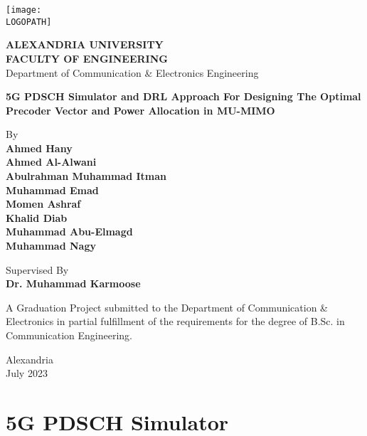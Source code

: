 \documentclass[12pt, a4paper, oneside]{book}
\def \LOGOPATH {au-logo1}
\def \UNIVERSITY {ALEXANDRIA UNIVERSITY}
\def \FACULTY {FACULTY OF ENGINEERING}
\def \DEPARTMENT {Department of Communication \& Electronics Engineering}
\def \PROJECTTITLE {5G PDSCH Simulator and DRL Approach For Designing The Optimal Precoder Vector and Power Allocation in MU-MIMO}
\def \SUPERVISOR {Dr. Muhammad Karmoose}
\begin{document}
\setlength{\parindent}{0em}
\setlength{\parskip}{1.5em}


\begin{titlepage}
    \centering
    \vfill
    \begin{center}
        \texttt{[image: \\LOGOPATH]}

        \vfill

        \textbf{\UNIVERSITY} \\
        \textbf{\FACULTY} \\
        \DEPARTMENT

        \vfill

        \LARGE{\textbf{\PROJECTTITLE}}
    
        \vfill
        By \\
        \textbf{Ahmed Hany} \\
        \textbf{Ahmed Al-Alwani} \\
        \textbf{Abulrahman Muhammad Itman} \\
        \textbf{Muhammad Emad} \\
        \textbf{Momen Ashraf} \\
        \textbf{Khalid Diab} \\
        \textbf{Muhammad Abu-Elmagd} \\
        \textbf{Muhammad Nagy}

        \vfill
        Supervised By \\
        \textbf{\SUPERVISOR}

        \vfill
        \large{A Graduation Project submitted to the Department of Communication \& Electronics in partial fulfillment of the requirements for the degree of B.Sc. in Communication Engineering.}

        \vspace{0.5cm}
        Alexandria\\
        July 2023
    
    \end{center}
\end{titlepage}

\setlength{\parskip}{0.75em}

\tableofcontents
\listoffigures

\setlength{\parskip}{0.8em}


\part{5G PDSCH Simulator}

\end{document}
